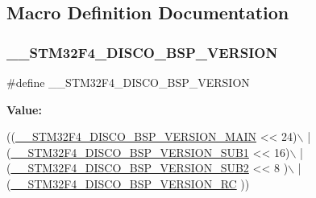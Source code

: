 \subsection{Macro Definition Documentation}
\mbox{\label{group___s_t_m32_f4___d_i_s_c_o_v_e_r_y___l_o_w___l_e_v_e_l___private___defines_ga1101b34f52c69caee56e6a2907352441}} 
\subsubsection{\texorpdfstring{\+\_\+\+\_\+\+S\+T\+M32\+F4\+\_\+\+D\+I\+S\+C\+O\+\_\+\+B\+S\+P\+\_\+\+V\+E\+R\+S\+I\+ON}{\_\_STM32F4\_DISCO\_BSP\_VERSION}}
{\footnotesize\ttfamily \#define \+\_\+\+\_\+\+S\+T\+M32\+F4\+\_\+\+D\+I\+S\+C\+O\+\_\+\+B\+S\+P\+\_\+\+V\+E\+R\+S\+I\+ON}

{\bfseries Value\+:}
\begin{DoxyCode}
((\mbox{\hyperlink{group___s_t_m32_f4___d_i_s_c_o_v_e_r_y___l_o_w___l_e_v_e_l___private___defines_ga9b9ce78017b00a5149e65e663676bf1a}{\_\_STM32F4\_DISCO\_BSP\_VERSION\_MAIN}} << 24)\(\backslash\)
                                             |(\mbox{\hyperlink{group___s_t_m32_f4___d_i_s_c_o_v_e_r_y___l_o_w___l_e_v_e_l___private___defines_ga53a734726d1b7247bb620a56de8d154e}{\_\_STM32F4\_DISCO\_BSP\_VERSION\_SUB1}}
       << 16)\(\backslash\)
                                             |(\mbox{\hyperlink{group___s_t_m32_f4___d_i_s_c_o_v_e_r_y___l_o_w___l_e_v_e_l___private___defines_ga56f24ebf9cca2d997596f4eb6aba19fc}{\_\_STM32F4\_DISCO\_BSP\_VERSION\_SUB2}}
       << 8 )\(\backslash\)
                                             |(\mbox{\hyperlink{group___s_t_m32_f4___d_i_s_c_o_v_e_r_y___l_o_w___l_e_v_e_l___private___defines_ga49aad18854e17cbfa696c09b9c02913c}{\_\_STM32F4\_DISCO\_BSP\_VERSION\_RC}}
      ))
\end{DoxyCode}


